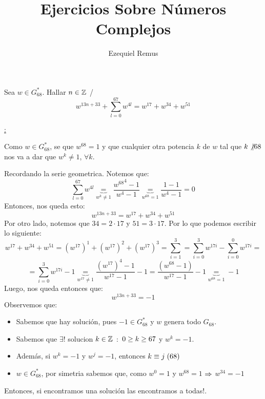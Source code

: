 \documentclass[10pt]{article}
\title{\bfseries \huge {Ejercicios Sobre Números Complejos}}
\author{Ezequiel Remus}
\date{}
\begin{document}
\renewcommand{\tablename}{Tabla}
\maketitle
\newpage

\tableofcontents
\newpage
\begin{problema}{}
Sea $w \in G_{68}^*$. Hallar $n \in \mathbb{Z}^{}$ /
\[w^{13n+33} + \sum_{l=0}^{67}w^{4l} = w^{17} + w^{34} + w^{51}\]
\end{problema}


\underline{:}

Como $w \in G_{68}^*$, se que $w^68 = 1$ y que cualquier otra potencia $k$ de $w$ tal que $k \not\vert 68$ nos va a dar que $w^k \neq 1$, $\forall k$.

Recordando la serie geometrica. Notemos que: 
\[\sum_{l=0}^{67}w^{4l} \underbrace{=}_{w^k \neq 1} \frac{{w^{68}}^4 - 1}{w^4 - 1} \underbrace{=}_{w^{68} = 1} \frac{1-1}{w^4 - 1} = 0\]
Entonces, nos queda esto:
\[w^{13n+33}  = w^{17} + w^{34} + w^{51}\]
Por otro lado, notemos que $34 = 2 \cdot 17$ y $51 = 3 \cdot 17$. Por lo que podemos escribir lo siguiente:
\[w^{17} + w^{34} + w^{51} = ({w^{17}})^1 + ({w^{17}})^2 + ({w^{17}})^3 = \sum_{i=1}^{3} = \sum_{i=0}^{3}w^{17i} - \sum_{i=0}^{0}w^{17i} = \]
\[= \sum_{i=0}^{3}w^{17i} - 1 \underbrace{=}_{w^{17} \neq 1} \frac{({w^{17}})^4 - 1}{w^17 - 1} - 1 = \frac{(w^{68} - 1)}{w^17 - 1} - 1 \underbrace{=}_{w^{68} = 1} -1\]
Luego, nos queda entonces que:
\[w^{13n+33} = -1 \]
Observemos que:

\begin{itemize}
 \item Sabemos que hay solución, pues $-1 \in G_{68}^* 
$ y $w$ genera todo  $G_{68}$.

\item Sabemos que $\exists !$ solucion $k \in \mathbb{Z}^{}$ $ : $ $ 0 \geq k \geq 67$ y $w^k = -1$. 

\item Además, si  $w^k = -1$ y $w^j = -1$, entonces $k \equiv j \hspace{0.1cm} (68)$

\item $w \in G_{68}^*$, por simetria sabemos que, como $w^0 = 1$ y $w^{68} = 1$ $\Rightarrow$ $w^{34} = -1$
\end{itemize}

Entonces, si encontramos una solución las encontramos a todas!.
\end{document}

